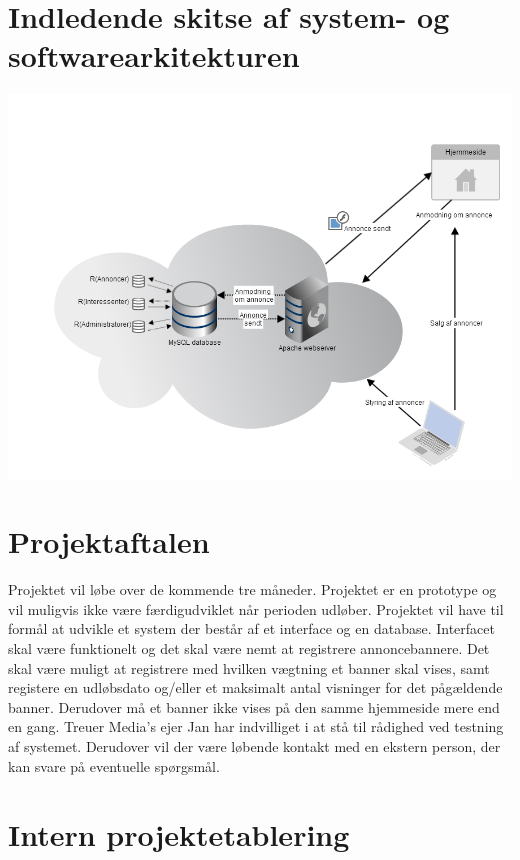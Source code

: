 \documentclass[a4paper,12pt]{article}
\begin{document}
\section{Indledende skitse af system- og softwarearkitekturen}

\includegraphics[width=\textwidth,height=\textheight,keepaspectratio]{architecture_diagram.png}

\section{Projektaftalen}

Projektet vil løbe over de kommende tre måneder. Projektet er en prototype og vil muligvis ikke være færdigudviklet når perioden udløber. Projektet vil have til formål at udvikle et system der består af et interface og en database.  Interfacet skal være funktionelt og det skal være nemt at registrere annoncebannere. Det skal være muligt at registrere med hvilken vægtning et banner skal vises, samt registere en udløbsdato og/eller et maksimalt antal visninger for det pågældende banner. Derudover må et banner ikke vises på den samme hjemmeside mere end en gang.
Treuer Media's ejer Jan har indvilliget i at stå til rådighed ved testning af systemet. Derudover vil der være løbende kontakt med en ekstern person, der kan svare på eventuelle spørgsmål.   

\section{Intern projektetablering}
\end{document}
